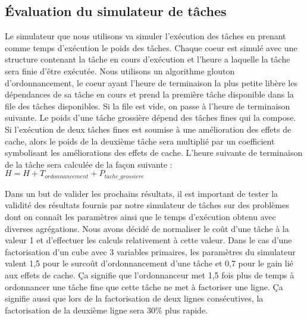 \subsection{\'Evaluation du simulateur de tâches}
Le simulateur que nous utilisons va simuler l'exécution des tâches en prenant comme temps d'exécution le poids des tâches.
%
Chaque coeur est simulé avec une structure contenant la tâche en cours d'exécution et l'heure a laquelle la tâche sera finie d'être exécutée.
%
Nous utilisons un algorithme glouton d'ordonnancement, le coeur ayant l'heure de terminaison la plus petite libère les dépendances de sa tâche en cours et prend la première tâche disponible dans la file des tâches disponibles.
%
Si la file est vide, on passe à l'heure de terminaison suivante.
%
Le poids d'une tâche grossière dépend des tâches fines qui la compose.
%
Si l'exécution de deux tâches fines est soumise à une amélioration des effets de cache, alors le poids de la deuxième tâche sera multiplié par un coefficient symbolisant les améliorations des effets de cache.
%
L'heure suivante de terminaison de la tâche sera calculée de la façon suivante : $H = H + T_{ordonnancement} + P_{tache\_grossiere}$



Dans un but de valider les prochains résultats, il est important de tester la validité des résultats fournis par notre simulateur de tâches sur des problèmes dont on connaît les paramètres ainsi que le temps d'exécution obtenu avec diverses agrégations.
%
Nous avons décidé de normaliser le coût d'une tâche à la valeur 1 et d'effectuer les calculs relativement à cette valeur.
%
Dans le cas d'une factorisation d'un cube avec 3 variables primaires, les paramètres du simulateur valent 1,5 pour le surcoût d'ordonnancement d'une tâche et 0,7 pour le gain lié aux effets de cache.
%
Ça signifie que l'ordonnanceur met 1,5 fois plus de temps à ordonnancer une tâche fine que cette tâche ne met à factoriser une ligne.
%
Ça signifie aussi que lors de la factorisation de deux lignes consécutives, la factorisation de la deuxième ligne sera 30\% plus rapide.
